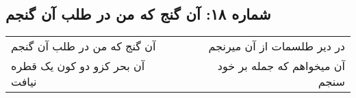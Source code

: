 \begin{center}
\section*{شماره ۱۸: آن گنج که من در طلب آن گنجم}
\label{sec:018}
\begin{longtable}{l p{0.5cm} r}
آن گنج که من در طلب آن گنجم
&&
در دیر طلسمات از آن میرنجم
\\
آن بحر کزو دو کون یک قطره نیافت
&&
آن میخواهم که جمله بر خود سنجم
\\
\end{longtable}
\end{center}
